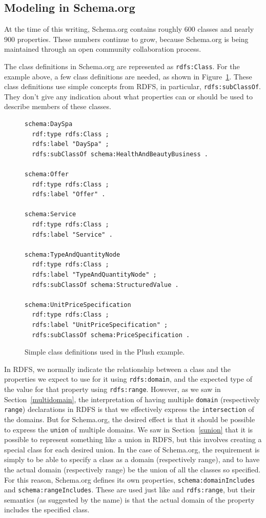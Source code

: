 \subsection{Modeling in Schema.org}


At the time of this writing, Schema.org contains roughly 600 classes and nearly 
900 properties.  These numbers continue to grow, because Schema.org is being
maintained through an open community collaboration process. 

The class definitions in Schema.org are represented as \texttt{rdfs:Class}.  
For the 
example above, a few class definitions are needed, as shown in Figure~\ref{fig:ch10.s.o.def}.  These class definitions use simple concepts from RDFS, in particular, 
\texttt{rdfs:subClassOf}.  They don't give any indication about what
properties can or should be used to describe members of these classes. 


\begin{figure}
\begin{lstlisting}
schema:DaySpa
  rdf:type rdfs:Class ;
  rdfs:label "DaySpa" ;
  rdfs:subClassOf schema:HealthAndBeautyBusiness .

schema:Offer
  rdf:type rdfs:Class ;
  rdfs:label "Offer" .
  
schema:Service
  rdf:type rdfs:Class ;
  rdfs:label "Service" .
  
schema:TypeAndQuantityNode
  rdf:type rdfs:Class ;
  rdfs:label "TypeAndQuantityNode" ;
  rdfs:subClassOf schema:StructuredValue .

schema:UnitPriceSpecification
  rdf:type rdfs:Class ;
  rdfs:label "UnitPriceSpecification" ;
  rdfs:subClassOf schema:PriceSpecification .
\end{lstlisting} 

    \caption{Simple class definitions used in the Plush example. }
    \label{fig:ch10.s.o.def}
\end{figure}

In RDFS, we normally indicate the relationship between a class and the properties
we expect to use for it using \texttt{rdfs:domain}, and the expected 
type of the value for that property using \texttt{rdfs:range}.  However, as we 
saw in Section~\ref{multidomain}, the interpretation of having multiple 
\texttt{domain} (respectively \texttt{range}) declarations in RDFS is that 
we effectively express the \texttt{intersection} of the domains.  But for 
Schema.org, the desired effect is that it should be possible to express the 
\texttt{union} of multiple domains.  We saw in Section~\ref{sunion} that it is 
possible to represent something like a union in RDFS, but this involves
creating a special class for each desired union.  In the case of Schema.org, 
the requirement is simply to be able to specify a class as a domain (respectively 
range), and to have the actual domain (respectively range) be the union of all 
the classes so specified.  For this reason, Schema.org defines its own 
properties, \texttt{schema:domainIncludes} and \texttt{schema:rangeIncludes}. 
These are used just like  and \texttt{rdfs:range}, but 
their semantics (as suggested by the name) is that the actual domain of 
the property includes the specified class. 

